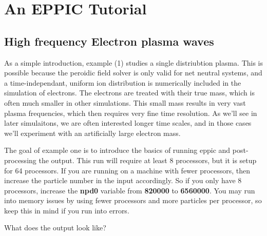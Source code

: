 

\chapter{An EPPIC Tutorial}

\section{High frequency Electron plasma waves}

As a simple introduction, example (1) studies a single distriubtion plasma. 
This is possible because the peroidic field solver is only valid for net
neutral systems, and a time-independant, uniform ion distribution is 
numerically included in the simulation of electrons. The electrons are treated
with their true mass, which is often much smaller in other simulations. This
small mass results in very vast plasma frequencies, which then requires very
fine time resolution. As we'll see in later simulaitons, we are often 
interested longer time scales, and in those cases we'll experiment with 
an artificially large electron mass. 

The goal of example one is to introduce the basics of running eppic and 
post-processing the output. This run will require at least 8 processors, but
it is setup for 64 processors. If you are running on a machine with
fewer processors, then increase the particle number in the input
accordingly. So if you only have 8 processors, increase the
\textbf{npd0} variable from \textbf{820000} to \textbf{6560000}. You
may run into memory issues by using fewer processors and more
particles per processor, so keep this in mind if you run into errors. 

What does the output look like?






